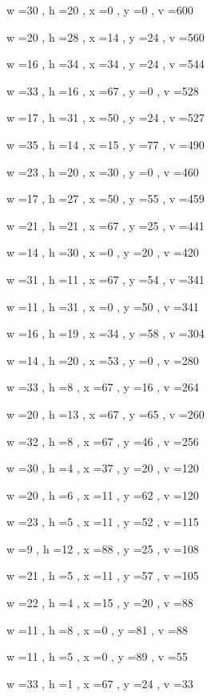 \documentclass[11pt]{article}
\begin{document}
w =30 , h =20 , x =0 , y =0 , v =600
\par
w =20 , h =28 , x =14 , y =24 , v =560
\par
w =16 , h =34 , x =34 , y =24 , v =544
\par
w =33 , h =16 , x =67 , y =0 , v =528
\par
w =17 , h =31 , x =50 , y =24 , v =527
\par
w =35 , h =14 , x =15 , y =77 , v =490
\par
w =23 , h =20 , x =30 , y =0 , v =460
\par
w =17 , h =27 , x =50 , y =55 , v =459
\par
w =21 , h =21 , x =67 , y =25 , v =441
\par
w =14 , h =30 , x =0 , y =20 , v =420
\par
w =31 , h =11 , x =67 , y =54 , v =341
\par
w =11 , h =31 , x =0 , y =50 , v =341
\par
w =16 , h =19 , x =34 , y =58 , v =304
\par
w =14 , h =20 , x =53 , y =0 , v =280
\par
w =33 , h =8 , x =67 , y =16 , v =264
\par
w =20 , h =13 , x =67 , y =65 , v =260
\par
w =32 , h =8 , x =67 , y =46 , v =256
\par
w =30 , h =4 , x =37 , y =20 , v =120
\par
w =20 , h =6 , x =11 , y =62 , v =120
\par
w =23 , h =5 , x =11 , y =52 , v =115
\par
w =9 , h =12 , x =88 , y =25 , v =108
\par
w =21 , h =5 , x =11 , y =57 , v =105
\par
w =22 , h =4 , x =15 , y =20 , v =88
\par
w =11 , h =8 , x =0 , y =81 , v =88
\par
w =11 , h =5 , x =0 , y =89 , v =55
\par
w =33 , h =1 , x =67 , y =24 , v =33
\par
\newpage
\end{document}
